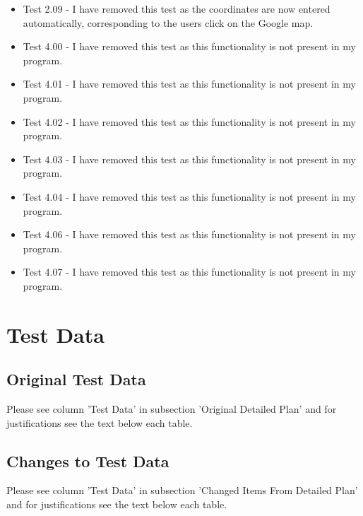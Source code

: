 \begin{landscape}
\begin{itemize}
\item Test 2.09 - I have removed this test as the coordinates are now entered automatically, corresponding to the users click on the Google map.

\item Test 4.00 - I have removed this test as this functionality is not present in my program.

\item Test 4.01 - I have removed this test as this functionality is not present in my program.

\item Test 4.02 - I have removed this test as this functionality is not present in my program.

\item Test 4.03 - I have removed this test as this functionality is not present in my program.

\item Test 4.04 - I have removed this test as this functionality is not present in my program.

\item Test 4.06 - I have removed this test as this functionality is not present in my program.

\item Test 4.07 - I have removed this test as this functionality is not present in my program.

\end{itemize}


\end{landscape}

\section{Test Data}

\subsection{Original Test Data}

Please see column 'Test Data' in subsection 'Original Detailed Plan' and for justifications see the text below each table.


\subsection{Changes to Test Data}

Please see column 'Test Data' in subsection 'Changed Items From Detailed Plan' and for justifications see the text below each table.

